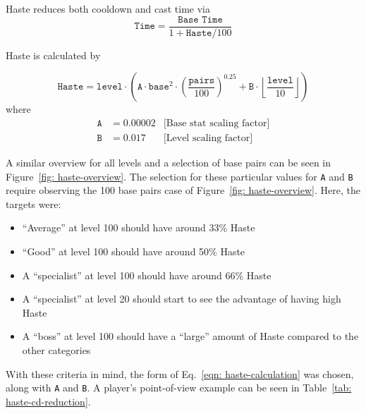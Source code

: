 \newpage
{}

Haste reduces both cooldown and cast time via
\begin{equation}\label{eqn: haste-cdr}
	\texttt{Time} = \frac{\texttt{Base Time}}{1 + \texttt{Haste}/100}
\end{equation}

\noindent Haste is calculated by

\begin{equation}\label{eqn: haste-calculation}
	\texttt{Haste} = \texttt{level} \cdot \left( \texttt{A} \cdot \texttt{base}^2 \cdot \left(\frac{\texttt{pairs}}{100}\right)^{0.25} + \texttt{B} \cdot \left\lfloor \frac{\texttt{level}}{10} \right\rfloor \right)	
\end{equation}
\noindent where
\begin{align*}
	\texttt{A} &= 0.00002 	& \text{[Base stat scaling factor]}\\
	\texttt{B} &= 0.017		& \text{[Level scaling factor]}
\end{align*}

\noindent A similar overview for all levels and a selection of base pairs can be seen in Figure~\ref{fig: haste-overview}. The selection for these particular values for \texttt{A} and \texttt{B} require observing the 100 base pairs case of Figure~\ref{fig: haste-overview}. Here, the targets were:

\begin{itemize}
	\item{``Average'' at level 100 should have around 33\% Haste}
	\item{``Good'' at level 100 should have around 50\% Haste}
	\item{A ``specialist'' at level 100 should have around 66\% Haste}
	\item{A ``specialist'' at level 20 should start to see the advantage of having high Haste}
	\item{A ``boss'' at level 100 should have a ``large'' amount of Haste compared to the other categories}
\end{itemize}

With these criteria in mind, the form of Eq.~\eqref{eqn: haste-calculation} was chosen, along with \texttt{A} and \texttt{B}. A player's point-of-view example can be seen in Table~\ref{tab: haste-cd-reduction}.



